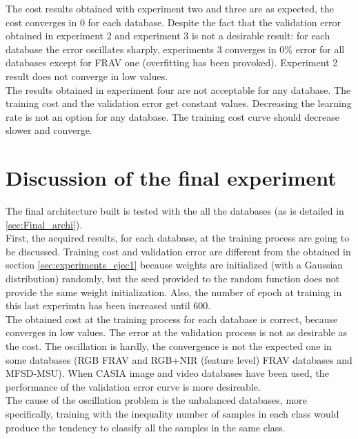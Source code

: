 The cost results obtained with experiment two and three are as expected, the cost converges in 0 for each database. Despite the fact that the validation error obtained in experiment 2 and experiment 3 is not a desirable result: for each database the error oscillates sharply, experiments 3 converges in 0\% error for all databases except for FRAV one (overfitting has been provoked). Experiment 2 result does not converge in low values.\\

The results obtained in experiment four are not acceptable for any database. The training cost and the validation error get constant values. Decreasing the learning rate is not an option for any database. The training cost curve should decrease slower and converge.\\

\section{Discussion of the final experiment}
The final architecture built is tested with the all the databases (as is detailed in \ref{sec:Final_archi}).\\

First, the acquired results, for each database, at the training process are going to be discussed. Training cost and validation error are different from the obtained in section \ref{sec:experiments_ejec1} because weights are initialized (with a Gaussian distribution) randomly, but the seed provided to the random function does not provide the same weight initialization. Also, the number of epoch at training in this last experimtn has been increased until 600.\\

The obtained cost at the training process for each database is correct, because converges in low values. The error at the validation process is not as desirable as the cost. The oscillation is hardly, the convergence is not the expected one in some databases (RGB FRAV and RGB+NIR (feature level) FRAV databases and MFSD-MSU). When CASIA image and video databases have been used, the performance of the validation error curve is more desireable.\\

The cause of the oscillation problem is the unbalanced databases, more specifically, training with the inequality number of samples in each class would produce the tendency to classify all the samples in the same class.\\

